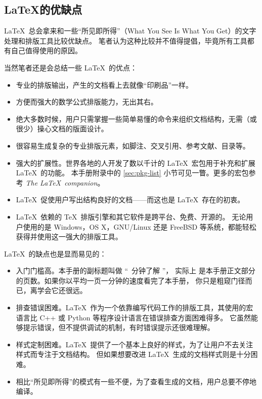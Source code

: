 \subsection{\LaTeX 的优缺点}\label{subec:advs}

\LaTeX\ 总会拿来和一些“所见即所得”（What You See Is What You Get）的文字处理和排版工具比较优缺点。
笔者认为这种比较并不值得提倡，毕竟所有工具都有自己值得使用的原因。

当然笔者还是会总结一些 \LaTeX\ 的优点：

\begin{itemize}
  \item 专业的排版输出，产生的文档看上去就像“印刷品”一样。

  \item 方便而强大的数学公式排版能力，无出其右。

  \item 绝大多数时候，用户只需掌握一些简单易懂的命令来组织文档结构，无需（或很少）操心文档的版面设计。

  \item 很容易生成复杂的专业排版元素，如脚注、交叉引用、参考文献、目录等。

  \item 强大的扩展性。世界各地的人开发了数以千计的 \LaTeX\ 宏包用于补充和扩展 \LaTeX\ 的功能。
  本手册附录中的 \ref{sec:pkg-list} 小节可见一瞥。更多的宏包参考 \textit{The \LaTeX\ companion}\cite{companion}。

  \item \LaTeX\ 促使用户写出结构良好的文档——而这也是 \LaTeX\ 存在的初衷。

  \item \LaTeX\ 依赖的 \TeX\ 排版引擎和其它软件是跨平台、免费、开源的。
  无论用户使用的是 Windows，OS X，GNU/Linux 还是 FreeBSD 等系统，都能轻松获得并使用这一强大的排版工具。
\end{itemize}

\LaTeX\ 的缺点也是显而易见的：
\begin{itemize}
  \item 入门门槛高。本手册的副标题叫做 “\pageref{lshort-minutes}~分钟了解 \LaTeXe ”，
  实际上 \pageref{lshort-minutes} 是本手册正文部分的页数。如果你以平均一页一分钟的速度看完了本手册，
  你只是粗窥门径而已，离学会它还很远。

  \item 排查错误困难。\LaTeX\ 作为一个依靠编写代码工作的排版工具，其使用的宏语言比 C++ 或 Python 等程序设计语言在错误排查方面困难得多。
  它虽然能够提示错误，但不提供调试的机制，有时错误提示还很难理解。

  \item 样式定制困难。\LaTeX\ 提供了一个基本上良好的样式，为了让用户不去关注样式而专注于文档结构。
  但如果想要改进 \LaTeX\ 生成的文档样式则是十分困难。

  \item 相比“所见即所得”的模式有一些不便，为了查看生成的文档，用户总要不停地编译。
\end{itemize}


